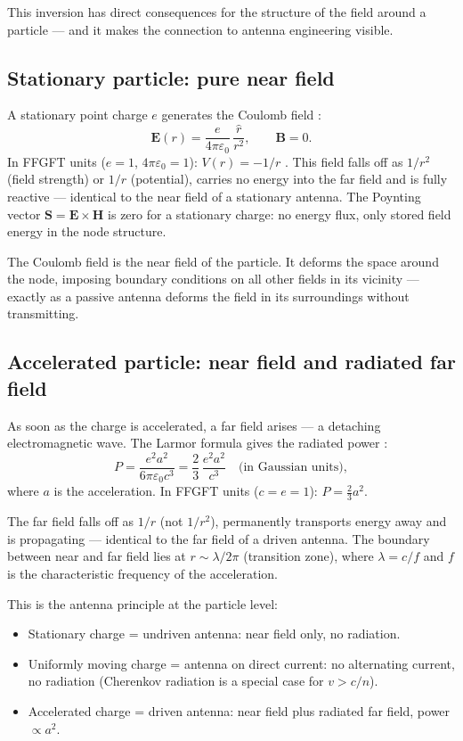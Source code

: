 This inversion has direct consequences for the structure of the field around
a particle --- and it makes the connection to antenna engineering visible.

\subsection*{Stationary particle: pure near field}

A stationary point charge $e$ generates the Coulomb field \EM:
\[
  \mathbf{E}(r) = \frac{e}{4\pi\varepsilon_0}\,\frac{\hat{r}}{r^2},
  \qquad
  \mathbf{B} = 0.
\]
In FFGFT units ($e=1$, $4\pi\varepsilon_0=1$): $V(r) = -1/r$
\cite{PascherDok365}. This field falls off as $1/r^2$ (field strength) or
$1/r$ (potential), carries no energy into the far field and is fully
reactive --- identical to the near field of a stationary antenna. The
Poynting vector $\mathbf{S} = \mathbf{E}\times\mathbf{H}$ is zero for a
stationary charge: no energy flux, only stored field energy in the node
structure.

The Coulomb field is the near field of the particle. It deforms the space
around the node, imposing boundary conditions on all other fields in its
vicinity --- exactly as a passive antenna deforms the field in its
surroundings without transmitting.

\subsection*{Accelerated particle: near field and radiated far field}

As soon as the charge is accelerated, a far field arises --- a detaching
electromagnetic wave. The Larmor formula gives the radiated power
\cite{Jackson1999,Griffiths1999}:
\[
  P = \frac{e^2 a^2}{6\pi\varepsilon_0 c^3}
    = \frac{2}{3}\,\frac{e^2 a^2}{c^3}
  \quad \text{(in Gaussian units)},
\]
where $a$ is the acceleration. In FFGFT units ($c=e=1$):
$P = \frac{2}{3}a^2$.

The far field falls off as $1/r$ (not $1/r^2$), permanently transports
energy away and is propagating --- identical to the far field of a driven
antenna. The boundary between near and far field lies at $r \sim \lambda/2\pi$
(transition zone), where $\lambda = c/f$ and $f$ is the characteristic
frequency of the acceleration.

This is the antenna principle at the particle level:
\begin{itemize}[nosep]
  \item Stationary charge = undriven antenna: near field only, no radiation.
  \item Uniformly moving charge = antenna on direct current: no alternating
    current, no radiation (Cherenkov radiation is a special case for $v > c/n$).
  \item Accelerated charge = driven antenna: near field plus radiated far
    field, power $\propto a^2$.
\end{itemize}

